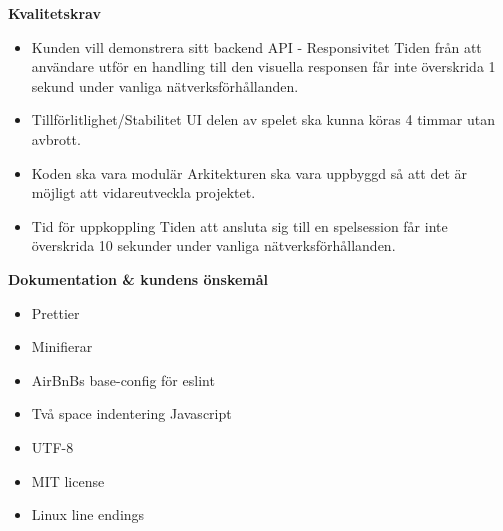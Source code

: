 \documentclass[10pt]{article}
\begin{document}
	\bigskip
	\begin{center}\textbf{Kvalitetskrav}\end{center}
	\begin{itemize}
		\item Kunden vill demonstrera sitt backend API - Responsivitet
		Tiden från att användare utför en handling till den visuella responsen får inte överskrida 1 sekund under vanliga nätverksförhållanden.
		\item Tillförlitlighet/Stabilitet
		UI delen av spelet ska kunna köras 4 timmar utan avbrott.
		\item Koden ska vara modulär
		Arkitekturen ska vara uppbyggd så att det är möjligt att vidareutveckla projektet.
		\item Tid för uppkoppling
		Tiden att ansluta sig till en spelsession får inte överskrida 10 sekunder under vanliga nätverksförhållanden. 
		\end{itemize}
	
		\bigskip
		\begin{center}\textbf{Dokumentation \& kundens önskemål}\end{center}
		\begin{itemize}
			\item Prettier
			\item Minifierar
			\item AirBnBs base-config för eslint
			\item Två space indentering Javascript
			\item UTF-8
			\item MIT license
			\item Linux line endings
		\end{itemize}
\end{document}
